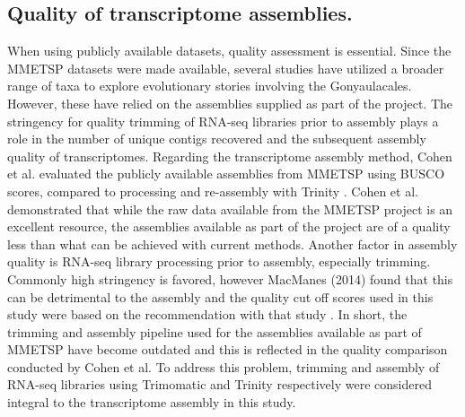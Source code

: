 \documentclass[12pt]{article}
\begin{document}
\subsection*{Quality of transcriptome assemblies.}
When using publicly available datasets, quality assessment is essential. 
Since the MMETSP datasets were made available, several studies have utilized a broader range of taxa to explore evolutionary stories involving the Gonyaulacales. 
However, these have relied on the assemblies supplied as part of the project. 
The stringency for quality trimming of RNA-seq libraries prior to assembly plays a role in the number of unique contigs recovered and the subsequent assembly quality of transcriptomes. 
Regarding the transcriptome assembly method, Cohen et al. evaluated the publicly available assemblies from MMETSP using BUSCO scores, compared to processing and re-assembly with Trinity \cite{cohen2018mmetsp}. 
Cohen et al. demonstrated that while the raw data available from the MMETSP project is an excellent resource, the assemblies available as part of the project are of a quality less than what can be achieved with current methods. 
Another factor in assembly quality is RNA-seq library processing prior to assembly, especially trimming. 
Commonly high stringency is favored, however MacManes (2014) found that this can be detrimental to the assembly and the quality cut off scores used in this study were based on the recommendation with that study \cite{macmanes2014optimal}.
In short, the trimming and assembly pipeline used for the assemblies available as part of MMETSP have become outdated and this is reflected in the quality comparison conducted by Cohen et al. 
To address this problem, trimming and assembly of RNA-seq libraries using Trimomatic and Trinity respectively were considered integral to the transcriptome assembly in this study.
\end{document}
